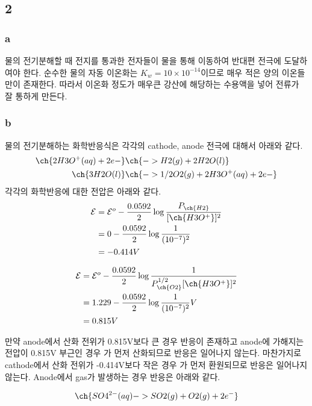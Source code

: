 \documentclass[%
 reprint,
 amsmath,amssymb,
 aps,
]{revtex4-2}
\begin{document}
\subsection{\label{sec:level2}2}
\subsubsection{\label{sec:level3}a}
물의 전기분해할 때 전지를 통과한 전자들이 물을 통해 이동하여 반대편 전극에 도달하여야 한다. 순수한 물의 자동 이온화는 $K_{w} = 10\times10^{-14}$이므로 매우 적은 양의 이온들만이 존재한다. 따라서 이온화 정도가 매우큰 강산에 해당하는 수용액을 넣어 전류가 잘 통하게 만든다.

\subsubsection{\label{sec:level3}b}
물의 전기분해하는 화학반응식은 각각의 cathode, anode 전극에 대해서 아래와 같다.
\begin{align}
	\ch{2 H3O^{+}(aq) + 2 e-}&\ch{ -> H2(g) + 2 H2O(l)} \\
	\ch{3 H2O(l)} &\ch{-> 1/2  O2(g) + 2 H3O^{+}(aq) + 2 e-}
\end{align}
각각의 화학반응에 대한 전압은 아래와 같다.
\begin{align}
	\mathcal{E} &= \mathcal{E}^{o} - \frac{0.0592}{2}\log{\frac{P_{\ch{H2}}}{[\ch{H3O^{+}}]^{2}}}\\
	&=0 - \frac{0.0592}{2}\log{\frac{1}{(10^{-7})^{2}}}\\
	&= -0.414V
\end{align}

\begin{align}
	\mathcal{E} &= \mathcal{E}^{o} - \frac{0.0592}{2}\log{\frac{1}{P_{\ch{O2}}^{1/2}[\ch{H3O^{+}}]^{2}}}\\
	&=1.229 - \frac{0.0592}{2}\log{\frac{1}{(10^{-7})^{2}}} V \\
	&= 0.815 V
\end{align}

만약 anode에서 산화 전위가 0.815V보다 큰 경우 반응이 존재하고 anode에 가해지는 전압이 0.815V 부근인 경우 가 먼저 산화되므로 반응은 일어나지 않는다. 마찬가지로 cathode에서 산화 전위가 -0.414V보다 작은 경우 가 먼저 환원되므로 반응은 일어나지 않는다. Anode에서  gas가 발생하는 경우 반응은 아래와 같다.

\begin{align}
	\ch{SO4^{2-}(aq) -> SO2(g) + O2(g) + 2 e^{-}}
\end{align}
\end{document}
